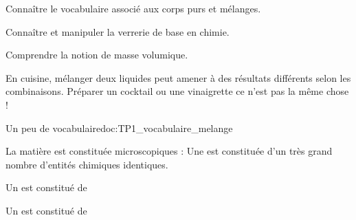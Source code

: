 \teteSndCorp

\vspace*{-36pt}


\begin{objectifs}
  \item Connaître le vocabulaire associé aux corps purs et mélanges.
  \item Connaître et manipuler la verrerie de base en chimie.
  \item Comprendre la notion de masse volumique.
\end{objectifs}

\begin{contexte}
  En cuisine, mélanger deux liquides peut amener à des résultats différents selon les combinaisons.
  Préparer un cocktail ou une vinaigrette ce n'est pas la même chose !
  
\end{contexte}


\begin{doc}{Un peu de vocabulaire}{doc:TP1_vocabulaire_melange}
  \begin{importants}
    La matière est constituée  microscopiques : 
    Une  est constituée d’un très grand nombre d’entités chimiques
identiques.
  \end{importants}
    
  \begin{importants}
    \begin{listePoints}
      \item Un  est constitué de 
      \item Un  est constitué de 
    \end{listePoints}
  \end{importants}
\end{doc}


